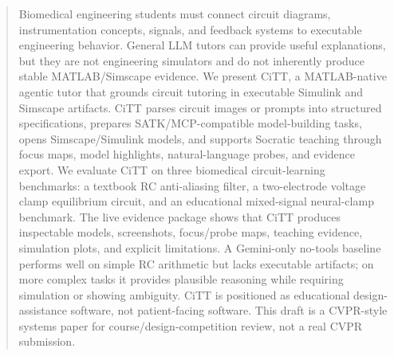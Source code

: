 \begin{abstract}
Biomedical engineering students must connect circuit diagrams, instrumentation concepts, signals, and feedback systems to executable engineering behavior. General LLM tutors can provide useful explanations, but they are not engineering simulators and do not inherently produce stable MATLAB/Simscape evidence. We present CiTT, a MATLAB-native agentic tutor that grounds circuit tutoring in executable Simulink and Simscape artifacts. CiTT parses circuit images or prompts into structured specifications, prepares SATK/MCP-compatible model-building tasks, opens Simscape/Simulink models, and supports Socratic teaching through focus maps, model highlights, natural-language probes, and evidence export. We evaluate CiTT on three biomedical circuit-learning benchmarks: a textbook RC anti-aliasing filter, a two-electrode voltage clamp equilibrium circuit, and an educational mixed-signal neural-clamp benchmark. The live evidence package shows that CiTT produces inspectable models, screenshots, focus/probe maps, teaching evidence, simulation plots, and explicit limitations. A Gemini-only no-tools baseline performs well on simple RC arithmetic but lacks executable artifacts; on more complex tasks it provides plausible reasoning while requiring simulation or showing ambiguity. CiTT is positioned as educational design-assistance software, not patient-facing software. This draft is a CVPR-style systems paper for course/design-competition review, not a real CVPR submission.
\end{abstract}
